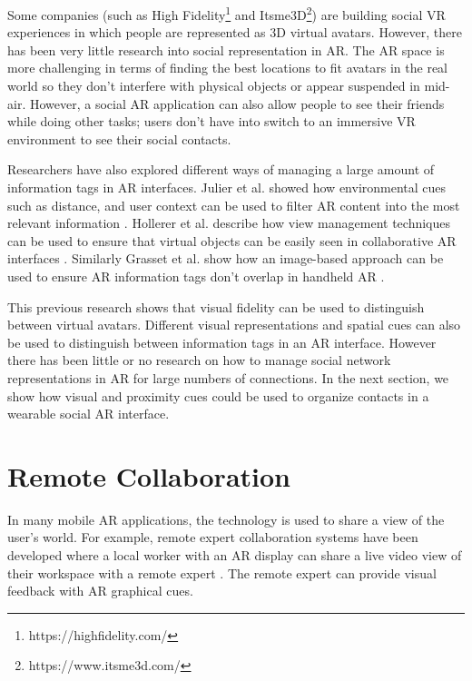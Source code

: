 Some companies (such as High Fidelity\footnote{https://highfidelity.com/} and Itsme3D\footnote{https://www.itsme3d.com/}) are building social VR experiences in which people are represented as 3D virtual avatars.
However, there has been very little research into social representation in AR. The AR space is more challenging in terms of finding the best locations to fit avatars in the real world so they don't interfere with physical objects or appear suspended in mid-air. However, a social  AR application can also allow people to see their friends while doing other tasks; users don't have into switch to an immersive VR environment to see their social contacts.

Researchers have also explored different ways of managing a large amount of information tags in AR interfaces.  Julier et al. showed how environmental cues such as distance, and user context can be used to filter AR content into the most relevant information \cite{Julier2002}. Hollerer et al. describe how view management techniques can be used to ensure that virtual objects can be easily seen in collaborative AR interfaces \cite{Hollerer2001}. Similarly Grasset et al. show how an image-based approach can be used to ensure AR information tags don't overlap in handheld AR \cite{Grasset2012}. 

This previous research shows that visual fidelity can be used to distinguish between virtual avatars. Different visual representations and spatial cues can also be used to distinguish between information tags in an AR interface. However there has been little or no research on how to manage social network representations in AR for large numbers of connections. In the next section, we show how visual and proximity cues could be used to organize contacts in a wearable social AR interface.

\section{Remote Collaboration}

In many mobile AR applications, the technology is used to share a view of the user's world. For example, remote expert collaboration systems have been developed where a local worker with an AR display can share a live video view of their workspace with a remote expert \cite{Billinghurst2002}. The remote expert can provide visual feedback with AR graphical cues.

